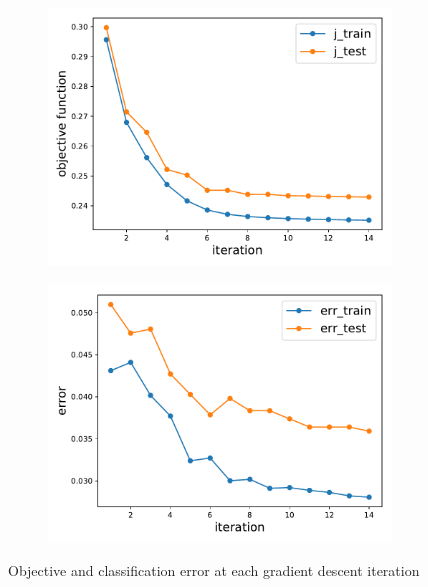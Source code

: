 \documentclass[11pt,letterpaper]{article}
\numberwithin{equation}{section}
\numberwithin{figure}{section}
\begin{document}
\begin{enumerate}
\begin{enumerate}
		\begin{figure}[H]
			\centering
			\begin{subfigure}[t]{.45\textwidth}
				\centering
				\includegraphics[width=\textwidth]{figures/mnist_gd_obj.pdf}
			\end{subfigure}
			\begin{subfigure}[t]{.45\textwidth}
				\centering
				\includegraphics[width=\textwidth]{figures/mnist_gd_err.pdf}
			\end{subfigure}
			\caption{Objective and classification error at each gradient descent iteration}
		\end{figure}





\end{enumerate}
\end{enumerate}
\end{document}
